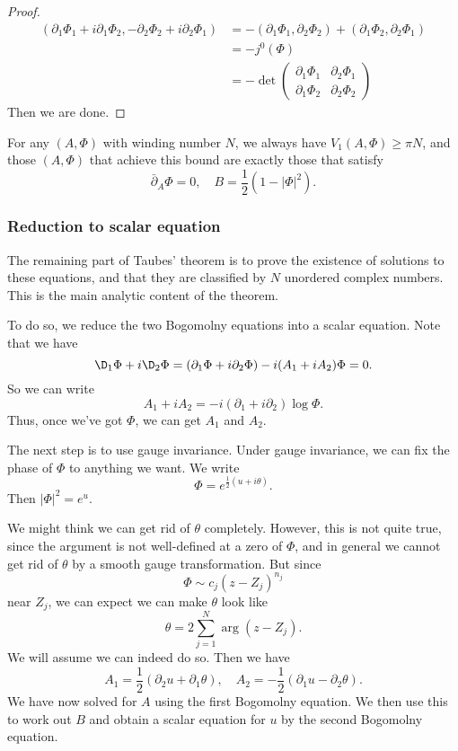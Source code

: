 \documentclass[a4paper]{article}
\begin{document}
\begin{proof}
  \begin{align*}
    (\partial_1 \Phi_1 + i \partial_1 \Phi_2, - \partial_2 \Phi_2 + i \partial_2 \Phi_1) &= - (\partial_1 \Phi_1, \partial_2 \Phi_2) + (\partial_1 \Phi_2, \partial_2 \Phi_1)\\
    &= -j^0(\Phi)\\
    &= - \det
    \begin{pmatrix}
      \partial_1 \Phi_1 & \partial_2 \Phi_1\\
      \partial_1 \Phi_2 & \partial_2 \Phi_2
    \end{pmatrix}
  \end{align*}
  Then we are done.
\end{proof}

\begin{cor}
  For any $(A, \Phi)$ with winding number $N$, we always have $V_1(A, \Phi) \geq \pi N$, and those $(A, \Phi)$ that achieve this bound are exactly those that satisfy
  \[
    \bar{\partial}_A \Phi = 0,\quad B = \frac{1}{2} (1 - |\Phi|^2).
  \]
\end{cor}

\subsubsection*{Reduction to scalar equation}
The remaining part of Taubes' theorem is to prove the existence of solutions to these equations, and that they are classified by $N$ unordered complex numbers. This is the main analytic content of the theorem.

To do so, we reduce the two Bogomolny equations into a scalar equation. Note that we have
\[
  \D_1 \Phi + i \D_2 \Phi = (\partial_1 \Phi + i \partial_2 \Phi) - i (A_1 + i A_2) \Phi = 0.
\]
So we can write
\[
  A_1 + i A_2 = - i (\partial_1 + i \partial_2) \log \Phi.
\]
Thus, once we've got $\Phi$, we can get $A_1$ and $A_2$.

The next step is to use gauge invariance. Under gauge invariance, we can fix the phase of $\Phi$ to anything we want. We write
\[
  \Phi = e^{\frac{1}{2} (u + i \theta)}.
\]
Then $|\Phi|^2 = e^u$.

We might think we can get rid of $\theta$ completely. However, this is not quite true, since the argument is not well-defined at a zero of $\Phi$, and in general we cannot get rid of $\theta$ by a smooth gauge transformation. But since
\[
  \Phi \sim c_j (z - Z_j)^{n_j}
\]
near $Z_j$, we can expect we can make $\theta$ look like
\[
  \theta = 2 \sum_{j = 1}^N \arg (z - Z_j).
\]
We will assume we can indeed do so. Then we have
\[
  A_1 = \frac{1}{2}(\partial_2 u + \partial_1 \theta),\quad A_2 = - \frac{1}{2} (\partial_1 u - \partial_2 \theta).
\]
We have now solved for $A$ using the first Bogomolny equation. We then use this to work out $B$ and obtain a scalar equation for $u$ by the second Bogomolny equation.
\end{document}
